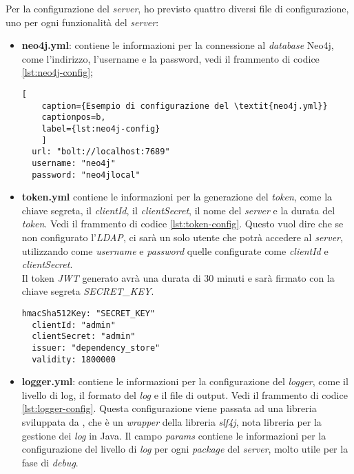 Per la configurazione del \textit{server}, ho previsto quattro diversi file di configurazione, uno per ogni funzionalità del \textit{server}:
\begin{itemize}
  \item \textbf{neo4j.yml}: contiene le informazioni per la connessione al \textit{database} Neo4j, come l'indirizzo, l'username e la password, vedi il frammento di codice \ref*{lst:neo4j-config};
  \begin{lstlisting}[
    caption={Esempio di configurazione del \textit{neo4j.yml}}
    captionpos=b, 
    label={lst:neo4j-config}
    ]
  url: "bolt://localhost:7689"
  username: "neo4j"
  password: "neo4jlocal"
  \end{lstlisting}
  \item \textbf{token.yml} contiene le informazioni per la generazione del \textit{token}, come la chiave segreta, il \textit{clientId}, il \textit{clientSecret}, il
    nome del \textit{server} e la durata del \textit{token}. Vedi il frammento di codice \ref*{lst:token-config}.
    Questo vuol dire che se non configurato l'\textit{LDAP}, ci sarà un solo utente che potrà accedere al \textit{server}, 
    utilizzando come \textit{username} e \textit{password} quelle configurate come \textit{clientId} e \textit{clientSecret}.\\
    Il token \textit{JWT} generato avrà una durata di 30 minuti e sarà firmato con la chiave segreta \textit{SECRET\_KEY}.
    \begin{lstlisting}[caption={Esempio di configurazione del \textit{token.yml}.},captionpos=b, label={lst:token-config}]
  hmacSha512Key: "SECRET_KEY"
  clientId: "admin"
  clientSecret: "admin"
  issuer: "dependency_store"
  validity: 1800000
    \end{lstlisting}
  \item \textbf{logger.yml}: contiene le informazioni per la configurazione del \textit{logger}, come il livello di log, il formato del \textit{log} e il file di output. Vedi il frammento di codice \ref*{lst:logger-config}.
    Questa configurazione viene passata ad una libreria sviluppata da \azienda{}, che è un \textit{wrapper} della libreria \textit{slf4j}, nota libreria per la gestione dei \textit{log} in Java.
    Il campo \textit{params} contiene le informazioni per la configurazione del livello di \textit{log} per ogni \textit{package} del \textit{server}, molto utile per la fase di \textit{debug}.
    \begin{lstlisting}[caption={Esempio di configurazione del \textit{logger.yml}.},captionpos=b, label={lst:logger-config}]

\end{lstlisting}
\end{itemize}
